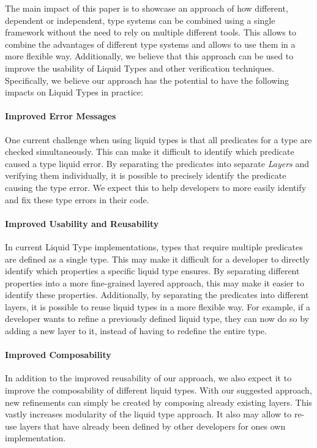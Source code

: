 The main impact of this paper is to showcase an approach of how different, dependent or independent, type systems can be combined using a single framework without the need to rely on multiple different tools. This allows to combine the advantages of different type systems and allows to use them in a more flexible way. Additionally, we believe that this approach can be used to improve the usability of Liquid Types and other verification techniques. Specifically, we believe our approach has the potential to have the following impacts on Liquid Types in practice:

\paragraph{Improved Error Messages}

One current challenge when using liquid types is that all predicates for a type are checked simultaneously. This can make it difficult to identify which predicate caused a type liquid error. By separating the predicates into separate \textit{Layers} and verifying them individually, it is possible to precisely identify the predicate causing the type error. We expect this to help developers to more easily identify and fix these type errors in their code.

\paragraph{Improved Usability and Reusability}

In current Liquid Type implementations, types that require multiple predicates are defined as a single type. This may make it difficult for a developer to directly identify which properties a specific liquid type ensures. By separating different properties into a more fine-grained layered approach, this may make it easier to identify these properties. Additionally, by separating the predicates into different layers, it is possible to reuse liquid types in a more flexible way. For example, if a developer wants to refine a previously defined liquid type, they can now do so by adding a new layer to it, instead of having to redefine the entire type.

\paragraph{Improved Composability}

In addition to the improved reusability of our approach, we also expect it to improve the composability of different liquid types. With our suggested approach, new refinements can simply be created by composing already existing layers. This vastly increases modularity of the liquid type approach. It also may allow to re-use layers that have already been defined by other developers for ones own implementation.

